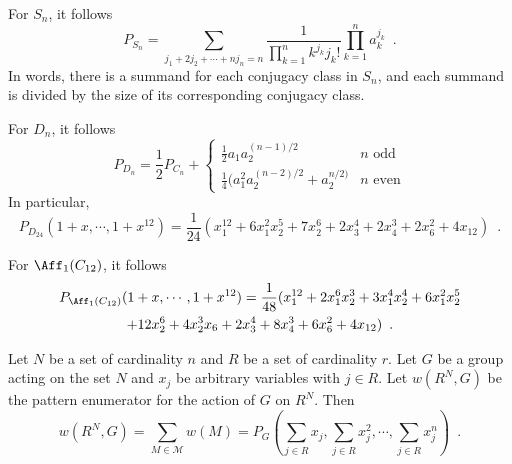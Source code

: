 \begin{example}
	For $S_n$, it follows
	\begin{equation}
		P_{S_n} = \sum_{j_1 + 2j_2 + \cdots + nj_n = n}
		\frac{1}{\prod_{k = 1}^n k^{j_k} j_k!} \prod_{k = 1}^n a_k^{j_k} \enspace.
	\end{equation}
	In words, there is a summand for each conjugacy class in $S_n$, and each
	summand is divided by the size of its corresponding conjugacy class.
\end{example}

\begin{example}
	For $D_n$, it follows
	\begin{equation}
		P_{D_n} = \frac{1}{2} P_{C_n} +
		\begin{cases}
			\frac{1}{2} a_1 a_2^{(n - 1) / 2} & n \text{ odd} \\
			\frac{1}{4} (a_1^2 a_2^{(n - 2) / 2} + a_2^{n / 2)} & n \text{ even}
		\end{cases}
	\end{equation}
	In particular,
	\begin{equation}
		P_{D_{24}}(1 + x, \cdots, 1 + x^{12}) = \frac{1}{24} ( x_1^{12} + 6 x_1^2 x_2^5 +
		7 x_2^6 + 2 x_3^4 + 2 x_4^3 + 2 x_6^2 + 4 x_{12} ) \enspace.
	\end{equation}
\end{example}

\begin{example}
	\cite[120]{FripertingerLackner2015}
	For $\Aff_1(C_{12})$, it follows
	\begin{multline}
		P_{\Aff_1(C_{12})}(1 + x, \cdots, 1 + x^{12}) = \frac{1}{48} (
		x_1^{12} + 2 x_1^6 x_2^3 + 3 x_1^4 x_2^4 + 6 x_1^2 x_2^5 \\ + 12 x_2^6 +
		4 x_2^3 x_6 + 2 x_3^4 + 8 x_4^3 + 6 x_6^2 + 4 x_{12} ) \enspace.
	\end{multline}
\end{example}

\pagebreak
\begin{theorem}[Polya]
	\cite[88]{Aigner2007}
	\cite[256]{Tucker1974}
	Let $N$ be a set of cardinality $n$ and $R$ be a set of cardinality $r$. Let $G$ be
	a group acting on the set $N$ and $x_j$ be arbitrary variables with $j \in R$.
	Let $w(R^N, G)$ be the pattern enumerator for the action of $G$ on $R^N$. Then
	\begin{equation}
		w(R^N, G) = \sum_{M \in \mathcal{M}} w(M) = P_G(\sum_{j \in R} x_j,
		\sum_{j \in R} x_j^2, \cdots, \sum_{j \in R} x_j^n) \enspace.
	\end{equation}
\end{theorem}

